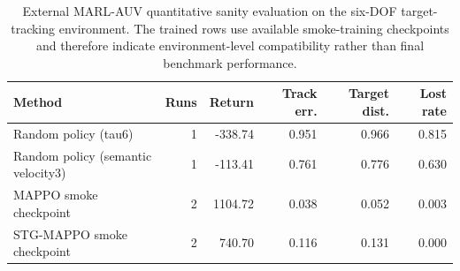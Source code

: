 \begin{table}[t]
  \centering
  \caption{External MARL-AUV quantitative sanity evaluation on the six-DOF target-tracking environment. The trained rows use available smoke-training checkpoints and therefore indicate environment-level compatibility rather than final benchmark performance.}
  \label{tab:marl_auv_quant}
  \begin{tabular}{lrrrrr}
    \toprule
    Method & Runs & Return & Track err. & Target dist. & Lost rate \\
    \midrule
    Random policy (tau6) & 1 & -338.74 & 0.951 & 0.966 & 0.815 \\
    Random policy (semantic velocity3) & 1 & -113.41 & 0.761 & 0.776 & 0.630 \\
    MAPPO smoke checkpoint & 2 & 1104.72 & 0.038 & 0.052 & 0.003 \\
    STG-MAPPO smoke checkpoint & 2 & 740.70 & 0.116 & 0.131 & 0.000 \\
    \bottomrule
  \end{tabular}
\end{table}
